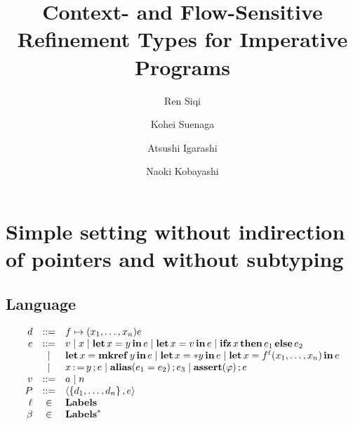\documentclass[runningheads]{llncs}
\begin{document}
%
\title{Context- and Flow-Sensitive Refinement Types for Imperative Programs}
%
%
\author{Ren Siqi \and Kohei Suenaga \and Atsushi Igarashi \and Naoki Kobayashi}
%
%
\institute{}
%
\maketitle              %
%
\begin{abstract}

\keywords{}
\end{abstract}
%
%
%

\section{Simple setting without indirection of pointers and without subtyping}

\newcommand\val{v}

\subsection{Language}

\[
  \begin{array}{rcl}
  \decl &::=& f \mapsto (x_1,\dots,x_n)\expr \\
  \expr &::= &
              \val \mid
              x \mid
              \LET x = y \IN \expr \mid
              \LET x = \val \IN \expr \mid
              \IFZERO x \THEN \expr_1 \ELSE \expr_2  \\ &\mid&
              \LET x = \MKREF y \IN \expr \mid
              \LET x = *y \IN \expr \mid
              \LET x = f^\ell(x_1,\dots,x_n) \IN \expr \\ &\mid&
              x \WRITE y \SEQ \expr \mid
              \ALIAS(\expr_1 = \expr_2) \SEQ \expr_3 \mid
              \ASSERT(\varphi) \SEQ \expr \\
    \val &::=& a \mid n\\
    \prog &::=& \tuple{\set{\decl_1, \dots, \decl_n}, \expr}\\
    \pp &\in& \textbf{Labels}\\
  \pps &\in& \textbf{Labels}^*
  \end{array}
\]
\end{document}
